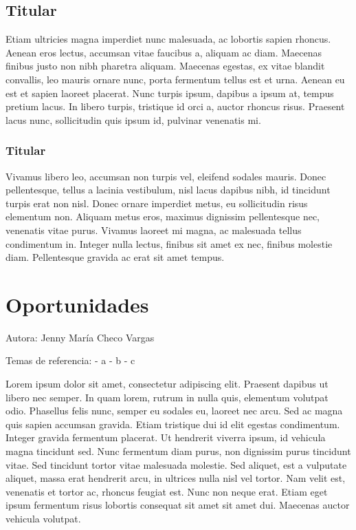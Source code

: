 \documentclass[
  letterpaper,
  DIV=11,
  numbers=noendperiod]{scrreprt}
\begin{document}
\hypertarget{titular-8}{%
\section{Titular}\label{titular-8}}

Etiam ultricies magna imperdiet nunc malesuada, ac lobortis sapien
rhoncus. Aenean eros lectus, accumsan vitae faucibus a, aliquam ac diam.
Maecenas finibus justo non nibh pharetra aliquam. Maecenas egestas, ex
vitae blandit convallis, leo mauris ornare nunc, porta fermentum tellus
est et urna. Aenean eu est et sapien laoreet placerat. Nunc turpis
ipsum, dapibus a ipsum at, tempus pretium lacus. In libero turpis,
tristique id orci a, auctor rhoncus risus. Praesent lacus nunc,
sollicitudin quis ipsum id, pulvinar venenatis mi.

\hypertarget{titular-9}{%
\subsection{Titular}\label{titular-9}}

Vivamus libero leo, accumsan non turpis vel, eleifend sodales mauris.
Donec pellentesque, tellus a lacinia vestibulum, nisl lacus dapibus
nibh, id tincidunt turpis erat non nisl. Donec ornare imperdiet metus,
eu sollicitudin risus elementum non. Aliquam metus eros, maximus
dignissim pellentesque nec, venenatis vitae purus. Vivamus laoreet mi
magna, ac malesuada tellus condimentum in. Integer nulla lectus, finibus
sit amet ex nec, finibus molestie diam. Pellentesque gravida ac erat sit
amet tempus.


\hypertarget{oportunidades}{%
\chapter{Oportunidades}\label{oportunidades}}

Autora: Jenny María Checo Vargas

Temas de referencia: - a - b - c

Lorem ipsum dolor sit amet, consectetur adipiscing elit. Praesent
dapibus ut libero nec semper. In quam lorem, rutrum in nulla quis,
elementum volutpat odio. Phasellus felis nunc, semper eu sodales eu,
laoreet nec arcu. Sed ac magna quis sapien accumsan gravida. Etiam
tristique dui id elit egestas condimentum. Integer gravida fermentum
placerat. Ut hendrerit viverra ipsum, id vehicula magna tincidunt sed.
Nunc fermentum diam purus, non dignissim purus tincidunt vitae. Sed
tincidunt tortor vitae malesuada molestie. Sed aliquet, est a vulputate
aliquet, massa erat hendrerit arcu, in ultrices nulla nisl vel tortor.
Nam velit est, venenatis et tortor ac, rhoncus feugiat est. Nunc non
neque erat. Etiam eget ipsum fermentum risus lobortis consequat sit amet
sit amet dui. Maecenas auctor vehicula volutpat.
\end{document}
